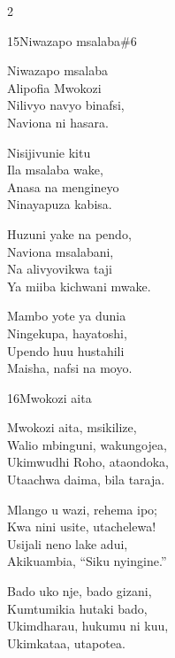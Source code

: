 \begin{multicols}{2}
\begin{hymn}{15}{Niwazapo msalaba}{\#6}
\begin{stanza}
Niwazapo msalaba\\
Alipofia Mwokozi\\
Nilivyo navyo binafsi,\\
Naviona ni hasara.
\end{stanza}
\begin{stanza}
Nisijivunie kitu\\
Ila msalaba wake,\\
Anasa na mengineyo\\
Ninayapuza kabisa.
\end{stanza}
\begin{stanza}
Huzuni yake na pendo,\\
Naviona msalabani,\\
Na alivyovikwa taji\\
Ya miiba kichwani mwake.
\end{stanza}
\begin{stanza}
Mambo yote ya dunia\\
Ningekupa, hayatoshi,\\
Upendo huu hustahili\\
Maisha, nafsi na moyo.
\end{stanza}
\end{hymn}

\begin{hymn}{16}{Mwokozi aita}{}
\begin{stanza}
Mwokozi aita, msikilize,\\
Walio mbinguni, wakungojea,\\
Ukimwudhi Roho, ataondoka,\\
Utaachwa daima, bila taraja.
\end{stanza}
\begin{stanza}
Mlango u wazi, rehema ipo;\\
Kwa nini usite, utachelewa!\\
Usijali neno lake adui,\\
Akikuambia, ``Siku nyingine.''
\end{stanza}
\begin{stanza}
Bado uko nje, bado gizani,\\
Kumtumikia hutaki bado,\\
Ukimdharau, hukumu ni kuu,\\
Ukimkataa, utapotea.
\end{stanza}
\end{hymn}


\end{multicols}
